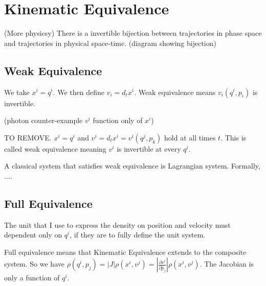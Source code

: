 \documentclass{article}
\begin{document}

\section{Kinematic Equivalence}

\begin{assump}
	(More physicsy) There is a invertible bijection between trajectories in phase space and trajectories in physical space-time. (diagram showing bijection)
\end{assump}

\subsection{Weak Equivalence}

\begin{defn}
	We take $x^i = q^i$. We then define $v_i = d_tx^i$. Weak equivalence means $v_i(q^i, p_i)$ is invertible.
\end{defn}

(photon counter-example $v^i$ function only of $x^i$)

\begin{prop}
	TO REMOVE. $x^i = q^i$ and $v^i = d_tx^i = v^i(q^j,p_k)$ hold at all times $t$.  This is called weak equivalence meaning $v^i$ is invertible at every $q^i$. 
\end{prop}

\begin{prop}
	A classical system that satisfies weak equivalence is Lagrangian system. Formally, ....
\end{prop}

\subsection{Full Equivalence}

The unit that I use to express the density on position and velocity must dependent only on $q^i$, if they are to fully define the unit system.

\begin{defn}
	Full equivalence means that Kinematic Equivalence extends to the composite system. So we have $\rho(q^i,p_j) = \left|J\right|\rho(x^i,v^j) = \left|\frac{\partial v^i}{\partial p_j}\right|\rho(x^i,v^j)$. The Jacobian is only a function of $q^i$.
\end{defn}
\end{document}
